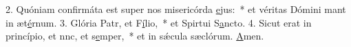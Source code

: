 2. Quóniam confirmáta est super nos misericórda \uline{e}jus:~* et véritas Dómini mant in æt\uline{é}rnum.
3. Glória Patr, et F\uline{í}lio,~* et Spirtui S\uline{a}ncto.
4. Sicut erat in princípio, et nnc, et s\uline{e}mper,~* et in sǽcula sæclórum. \uline{A}men.
